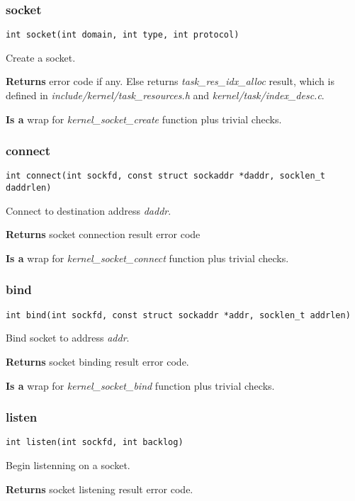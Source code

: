 \documentclass[12pt,a4paper]{article}
\begin{document}
\subsubsection{socket}
\label{sec:socket_c_socket}
\begin{verbatim}
int socket(int domain, int type, int protocol)
\end{verbatim}
Create a socket.

{\bf Returns} error code if any. Else returns
{\it task\_res\_idx\_alloc} result, which is defined in
{\it include/kernel/task\_resources.h} and {\it kernel/task/index\_desc.c}.

{\bf Is a} wrap for {\it kernel\_socket\_create} function plus trivial checks.

\subsubsection{connect}
\label{sec:socket_c_connectn}
\begin{verbatim}
int connect(int sockfd, const struct sockaddr *daddr, socklen_t daddrlen)
\end{verbatim}
Connect to destination address {\it daddr}.

{\bf Returns} socket connection result error code

{\bf Is a} wrap for {\it kernel\_socket\_connect} function  plus trivial checks. 

\subsubsection{bind}
\label{sec:socket_c_bind}
\begin{verbatim}
int bind(int sockfd, const struct sockaddr *addr, socklen_t addrlen)
\end{verbatim}
Bind socket to address {\it addr}.

{\bf Returns} socket binding result error code.

{\bf Is a} wrap for {\it kernel\_socket\_bind} function  plus trivial checks.

\subsubsection{listen}
\label{sec:socket_c_listen}
\begin{verbatim}
int listen(int sockfd, int backlog)
\end{verbatim}
Begin listenning on a socket.

{\bf Returns} socket listening result error code.
\end{document}
